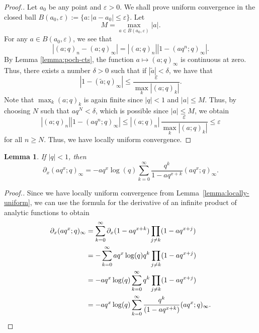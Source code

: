 \documentclass[11pt]{article}
\newtheorem{lemma}{Lemma}
\begin{document}
\begin{proof}[Proof.]
Let $a_0$ be any point and $\varepsilon > 0$. We shall prove uniform convergence in the closed ball $B(a_0, \varepsilon) := \{ a : |a - a_0| \le \varepsilon \}$.
Let
\[
    M = \max_{a \in B(a_0, \varepsilon)} |a|.
\]
For any $a \in B(a_0,\varepsilon)$, we see that 
\[
    |(a;q)_n - (a;q)_\infty| = |(a;q)_n||1-(aq^n;q)_\infty|.
\]
By Lemma \ref{lemma:poch-cts}, the function $a \mapsto (a; q)_\infty$ is continuous at zero. Thus, there exists a number $\delta > 0$ such that if $|\tilde{a}| < \delta$, we have that 
\[
    |1 - (\tilde{a};q)_\infty| \le \frac{\varepsilon}{\max_k |(a;q)_k|}.
\]
Note that $\max_k (a;q)_k$ is again finite since $|q| < 1$ and $|a| \le M$.
Thus, by choosing $N$ such that $aq^N < \delta$, which is possible since $|a| \le M$, we obtain
\[
    |(a;q)_n||1-(aq^n;q)_\infty| \le |(a;q)_n| \, \frac{\varepsilon}{\max_k |(a;q)_k|} \le \varepsilon
\]
for all $n \geq N$. Thus, we have locally uniform convergence. 
\end{proof}

\begin{lemma} \label{lemma:derivative}
If $|q| < 1$, then 
\[
    \partial_x (aq^x;q)_\infty = -aq^{x}\log(q)\sum_{k=0}^\infty \frac{q^k}{1-aq^{x+k}} (aq^x;q)_\infty.
\]
\end{lemma}

\begin{proof}[Proof.]
Since we have locally uniform convergence from Lemma~\ref{lemma:locally-uniform}, we can use the formula for the derivative of an infinite product of analytic functions to obtain
\begin{align*}
    \partial_x(aq^x;q)_\infty &= \sum_{k=0}^\infty \partial_x(1-aq^{x+k}) \prod_{j \neq k}(1-aq^{x+j}) \\
    &= -\sum_{k=0}^\infty aq^{x}\log(q)q^k \prod_{j \neq k}(1-aq^{x+j}) \\
    &= -aq^{x}\log(q)\sum_{k=0}^\infty q^k \prod_{j \neq k}(1-aq^{x+j})\\
    &= -aq^{x}\log(q)\sum_{k=0}^\infty  \frac{q^k}{(1-aq^{x+k})}  (aq^x;q)_\infty.
    \qedhere
\end{align*}
\end{proof}
\end{document}
